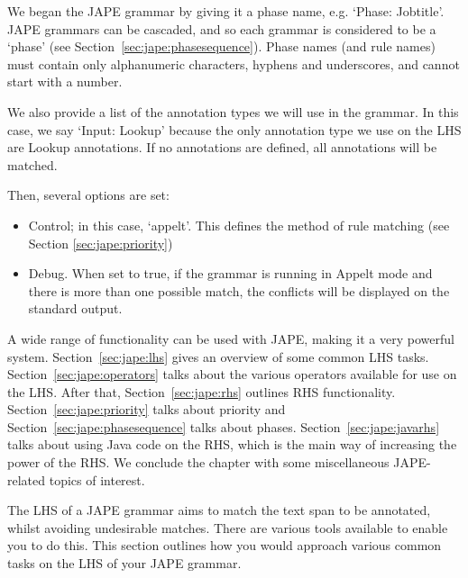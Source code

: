 We began the JAPE grammar by giving it a phase name, e.g. `Phase: Jobtitle'. JAPE
grammars can be cascaded, and so each grammar is considered to be a `phase' (see
Section~\ref{sec:jape:phasesequence}). 
Phase names (and rule names) must contain only alphanumeric characters, hyphens
and underscores, and cannot start with a number.

We also provide a list of the annotation
types we will use in the grammar. In this case, we say `Input: Lookup' because
the only annotation type we use on the LHS are Lookup annotations. If no
annotations are defined, all annotations will be matched.

Then, several options are set:

\begin{itemize}

\item Control; in this case, `appelt'. This defines the method of rule matching
(see Section \ref{sec:jape:priority})

\item Debug. When set to true, if the grammar is running in Appelt
mode and there is more than one possible match, the conflicts will be
displayed on the standard output.

\end{itemize}

A wide range of functionality can be used with JAPE, making it a very powerful
system. Section~\ref{sec:jape:lhs} gives an overview of some common LHS tasks.
Section~\ref{sec:jape:operators} talks about the various operators available for
use on the LHS. After that, Section~\ref{sec:jape:rhs} outlines RHS
functionality. Section~\ref{sec:jape:priority} talks about priority and
Section~\ref{sec:jape:phasesequence} talks about phases.
Section~\ref{sec:jape:javarhs} talks about using Java code on the RHS, which is
the main way of increasing the power of the RHS. We conclude the chapter with
some miscellaneous JAPE-related topics of interest.


The LHS of a JAPE grammar aims to match the text span to be annotated, whilst
avoiding undesirable matches. There are various tools available to enable you
to do this. This section outlines how you would approach various common tasks
on the LHS of your JAPE grammar.


